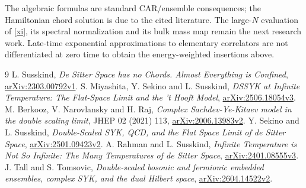 \documentclass[11pt,a4paper]{article}
\begin{document}
The algebraic formulas are standard CAR/ensemble consequences; the
Hamiltonian chord solution is due to the cited literature. The
large-$N$ evaluation of \eqref{xi}, its spectral normalization and its
bulk mass map remain the next research work. Late-time exponential
approximations to elementary correlators are not differentiated at
zero time to obtain the energy-weighted insertions above.

\newpage
\begin{thebibliography}{9}\small
{} L. Susskind, \emph{De Sitter Space has no Chords.
Almost Everything is Confined},
\href{https://arxiv.org/abs/2303.00792v1}{arXiv:2303.00792v1}.
 S. Miyashita, Y. Sekino and L. Susskind,
\emph{DSSYK at Infinite Temperature: The Flat-Space Limit and the
't Hooft Model}, \href{https://arxiv.org/abs/2506.18054v3}{arXiv:2506.18054v3}.
 M. Berkooz, V. Narovlansky and H. Raj,
\emph{Complex Sachdev-Ye-Kitaev model in the double scaling limit},
JHEP 02 (2021) 113,
\href{https://arxiv.org/abs/2006.13983v2}{arXiv:2006.13983v2}.
 Y. Sekino and L. Susskind, \emph{Double-Scaled SYK,
QCD, and the Flat Space Limit of de Sitter Space},
\href{https://arxiv.org/abs/2501.09423v2}{arXiv:2501.09423v2}.
 A. Rahman and L. Susskind, \emph{Infinite Temperature
is Not So Infinite: The Many Temperatures of de Sitter Space},
\href{https://arxiv.org/abs/2401.08555v3}{arXiv:2401.08555v3}.
 J. Tall and S. Tomsovic, \emph{Double-scaled bosonic and
fermionic embedded ensembles, complex SYK, and the dual Hilbert space},
\href{https://arxiv.org/abs/2604.14522v2}{arXiv:2604.14522v2}.
\end{thebibliography}
\end{document}

